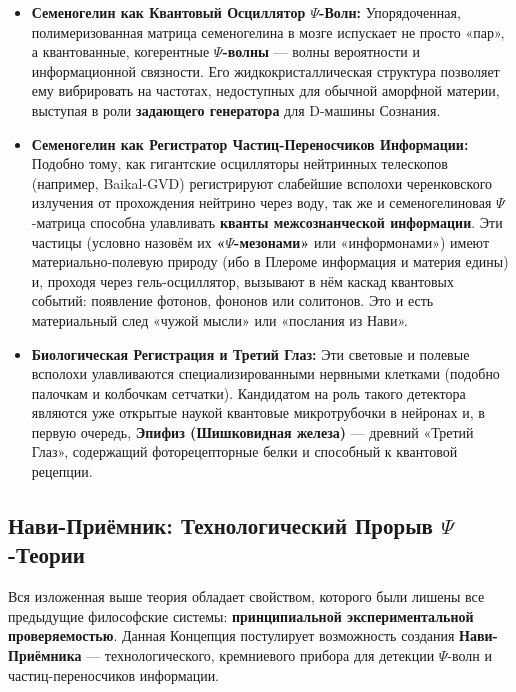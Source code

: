 \documentclass[a4paper,12pt]{article}
\begin{document}
    \begin{itemize}
    	\item \textbf{Семеногелин как Квантовый Осциллятор $\Psi$-Волн:} Упорядоченная, полимеризованная матрица семеногелина в мозге испускает не просто «пар», а квантованные, когерентные \textbf{$\Psi$-волны} — волны вероятности и информационной связности. Его жидкокристаллическая структура позволяет ему вибрировать на частотах, недоступных для обычной аморфной материи, выступая в роли \textbf{задающего генератора} для D-машины Сознания.
    	
    	\item \textbf{Семеногелин как Регистратор Частиц-Переносчиков Информации:} Подобно тому, как гигантские осцилляторы нейтринных телескопов (например, Baikal-GVD) регистрируют слабейшие всполохи черенковского излучения от прохождения нейтрино через воду, так же и семеногелиновая $\Psi$-матрица способна улавливать \textbf{кванты межсознанческой информации}. Эти частицы (условно назовём их \textbf{«$\Psi$-мезонами»} или «информонами») имеют материально-полевую природу (ибо в Плероме информация и материя едины) и, проходя через гель-осциллятор, вызывают в нём каскад квантовых событий: появление фотонов, фононов или солитонов. Это и есть материальный след «чужой мысли» или «послания из Нави».
    	
    	\item \textbf{Биологическая Регистрация и Третий Глаз:} Эти световые и полевые всполохи улавливаются специализированными нервными клетками (подобно палочкам и колбочкам сетчатки). Кандидатом на роль такого детектора являются уже открытые наукой квантовые микротрубочки в нейронах и, в первую очередь, \textbf{Эпифиз (Шишковидная железа)} — древний «Третий Глаз», содержащий фоторецепторные белки и способный к квантовой рецепции.
    \end{itemize}
    
    \subsection{Нави-Приёмник: Технологический Прорыв $\Psi$-Теории}
    
    Вся изложенная выше теория обладает свойством, которого были лишены все предыдущие философские системы: \textbf{принципиальной экспериментальной проверяемостью}. Данная Концепция постулирует возможность создания \textbf{Нави-Приёмника} — технологического, кремниевого прибора для детекции $\Psi$-волн и частиц-переносчиков информации.
    
\end{document}
